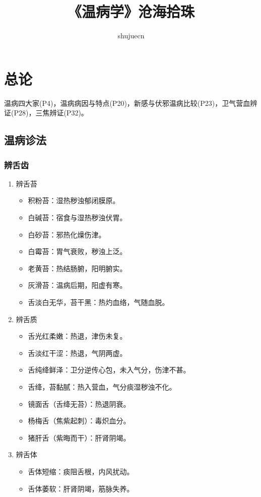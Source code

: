 \documentclass[cn,black,12pt,founder,normal,twocolumn]{elegantnote}
\title{《温病学》沧海拾珠}
\author{shujuecn}
\date{\zhtoday}
\begin{document}
\maketitle

\section{总论}

温病四大家(P4)，温病病因与特点(P20)，新感与伏邪温病比较(P23)，卫气营血辨证(P28)，三焦辨证(P32)。

\subsection{温病诊法}

\subsubsection{辨舌齿}

\begin{enumerate}
    \item 辨舌苔
    \begin{itemize}
        \item 积粉苔：湿热秽浊郁闭膜原。
        \item 白碱苔：宿食与湿热秽浊伏胃。
        \item 白砂苔：邪热化燥伤津。
        \item 白霉苔：胃气衰败，秽浊上泛。
        \item 老黄苔：热结肠腑，阳明腑实。
        \item 灰滑苔：温病后期，阳虚有寒。
        \item 舌淡白无华，苔干黑：热灼血络，气随血脱。
    \end{itemize}
    \item 辨舌质
    \begin{itemize}
        \item 舌光红柔嫩：热退，津伤未复。
        \item 舌淡红干涩：热退，气阴两虚。
        \item 舌纯绛鲜泽：卫分逆传心包，未入气分，伤津不甚。
        \item 舌绛，苔黏腻：热入营血，气分痰湿秽浊不化。
        \item 镜面舌（舌绛无苔）：热退阴衰。
        \item 杨梅舌（焦紫起刺）：毒炽血分。
        \item 猪肝舌（紫晦而干）：肝肾阴竭。
    \end{itemize}
    \item 辨舌体
    \begin{itemize}
        \item 舌体短缩：痰阻舌根，内风扰动。
        \item 舌体萎软：肝肾阴竭，筋脉失养。
    \end{itemize}
\end{enumerate}
\end{document}
